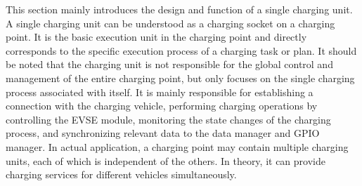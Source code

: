 \documentclass[
english,
ruledheaders=section,%
class=report,%
thesis={type=Report},%
accentcolor=9c,%
custommargins=true,%
marginpar=false,%
parskip=half-,%
fontsize=11pt,%
logofile={img/tuda_logo.pdf}, %
]{tudapub}
\begin{document}
    This section mainly introduces the design and function of a single charging unit. A single charging unit can be understood as a charging socket on a charging point. It is the basic execution unit in the charging point and directly corresponds to the specific execution process of a charging task or plan. It should be noted that the charging unit is not responsible for the global control and management of the entire charging point, but only focuses on the single charging process associated with itself. It is mainly responsible for establishing a connection with the charging vehicle, performing charging operations by controlling the EVSE module, monitoring the state changes of the charging process, and synchronizing relevant data to the data manager and GPIO manager. In actual application, a charging point may contain multiple charging units, each of which is independent of the others. In theory, it can provide charging services for different vehicles simultaneously.
\end{document}

